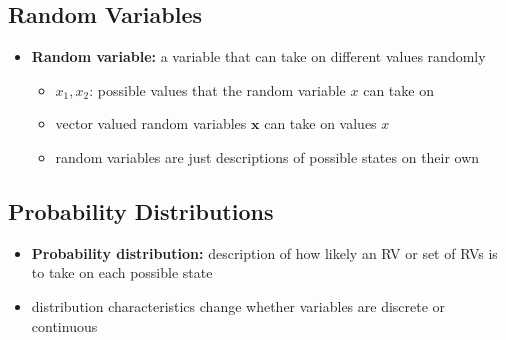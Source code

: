 \subsection{Random Variables}
\begin{itemize}
    \item \textbf{Random variable:} a variable that can take on different values randomly
    \begin{itemize}
        \item $x_1, x_2$: possible values that the random variable $x$ can take on
        \item vector valued random variables $\mathbf{x}$ can take on values $x$
        \item random variables are just descriptions of possible states on their own
    \end{itemize}
\end{itemize}

\subsection{Probability Distributions}
\begin{itemize}
    \item \textbf{Probability distribution:} description of how likely an RV or set of RVs is to take on each possible state
    \item distribution characteristics change whether variables are discrete or continuous
\end{itemize}
